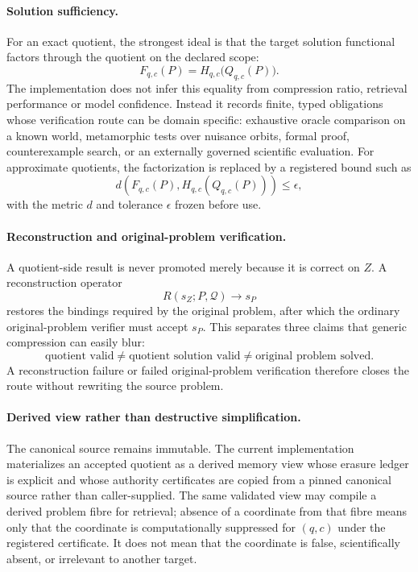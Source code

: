 \paragraph{Solution sufficiency.}
For an exact quotient, the strongest ideal is that the target solution functional factors through the quotient on the declared scope:
\[
F_{q,c}(P)=H_{q,c}\bigl(Q_{q,c}(P)\bigr).
\]
The implementation does not infer this equality from compression ratio, retrieval performance or model confidence. Instead it records finite, typed obligations whose verification route can be domain specific: exhaustive oracle comparison on a known world, metamorphic tests over nuisance orbits, formal proof, counterexample search, or an externally governed scientific evaluation. For approximate quotients, the factorization is replaced by a registered bound such as
\[
d\!\left(F_{q,c}(P),H_{q,c}(Q_{q,c}(P))\right)\le \epsilon,
\]
with the metric $d$ and tolerance $\epsilon$ frozen before use.

\paragraph{Reconstruction and original-problem verification.}
A quotient-side result is never promoted merely because it is correct on $Z$. A reconstruction operator
\[
R(s_Z;P,\mathcal Q)\longrightarrow s_P
\]
restores the bindings required by the original problem, after which the ordinary original-problem verifier must accept $s_P$. This separates three claims that generic compression can easily blur:
\[
\text{quotient valid}\neq\text{quotient solution valid}\neq\text{original problem solved}.
\]
A reconstruction failure or failed original-problem verification therefore closes the route without rewriting the source problem.

\paragraph{Derived view rather than destructive simplification.}
The canonical source remains immutable. The current implementation materializes an accepted quotient as a derived memory view whose erasure ledger is explicit and whose authority certificates are copied from a pinned canonical source rather than caller-supplied. The same validated view may compile a derived problem fibre for retrieval; absence of a coordinate from that fibre means only that the coordinate is computationally suppressed for $(q,c)$ under the registered certificate. It does not mean that the coordinate is false, scientifically absent, or irrelevant to another target.

